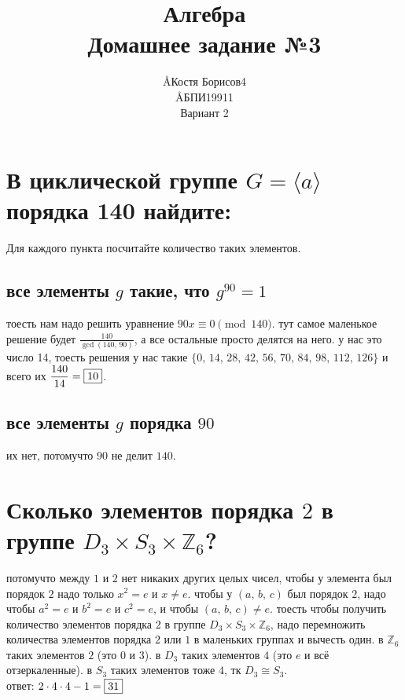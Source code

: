 \documentclass{article}
\title{Алгебра \\ Домашнее задание №3}
\author{\AA{Костя Борисов}{4} \\ \AA{БПИ199}{11} \\ Вариант 2}
\newcommand{\ds}{\displaystyle}
\newcommand{\Z}{\mathbb{Z}}
\renewcommand{\f}{\frac}
\begin{document}
  \maketitle

  \section{В циклической группе $G = \langle a \rangle$ порядка 140 найдите:}
  Для каждого пункта посчитайте количество таких элементов.
  \subsection{все элементы $g$ такие, что $g^{90} = 1$}
  тоесть нам надо решить уравнение $90x \equiv 0 \pmod{140}$.
  тут самое маленькое решение будет $\ds\f{140}{\gcd(140,\,90)}$,
  а все остальные просто делятся на него.
  у нас это число 14, тоесть решения у нас такие $\{0,\,14,\,28,\,42,\,56,\,70,\,84,\,98,\,112,\,126\}$
  и всего их $\ds \f{140}{14} = \fbox{10}$.
  \subsection{все элементы $g$ порядка $90$}
  их нет, потомучто $90$ не делит $140$.

  \section{Сколько элементов порядка $2$ в группе $D_3 \times S_3 \times \Z_6$?}
  потомучто между $1$ и $2$ нет никаких других целых чисел,
  чтобы у элемента был порядок $2$ надо только $x^2 = e$ и $x \neq e$.
  чтобы у $(a,\, b,\, c)$ был порядок $2$, надо чтобы $a^2 = e$ и $b^2 = e$ и $c^2 = e$, и чтобы $(a,\, b,\, c) \neq e$.
  тоесть чтобы получить количество элементов порядка $2$ в группе $D_3 \times S_3 \times \Z_6$,
  надо перемножить количества элементов порядка $2$ или $1$ в маленьких группах и вычесть один.
  в $\Z_6$ таких элементов $2$ (это $0$ и $3$).
  в $D_3$ таких элементов $4$ (это $e$ и всё отзеркаленные).
  в $S_3$ таких элементов тоже $4$, тк $D_3 \cong S_3$.
  \\ ответ: $2 \cdot 4 \cdot 4 - 1 = \fbox{31}$
\end{document}
